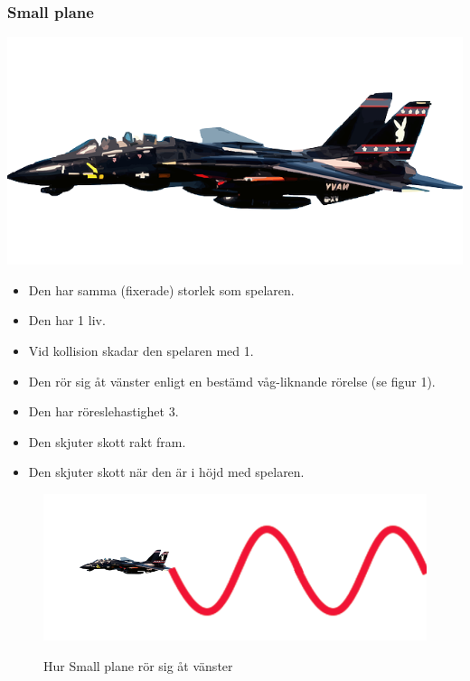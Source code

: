 \documentclass{TDP005mall}
\begin{document}
\subsubsection*{Small plane}
\includegraphics[scale=0.15]{Images/Enemy1.png}
\begin{itemize}
\item Den har samma (fixerade) storlek som spelaren.
\item Den har 1 liv.
\item Vid kollision skadar den spelaren med 1.
\item Den rör sig åt vänster enligt en bestämd våg-liknande rörelse (se figur 1).
\item Den har röreslehastighet 3. 
\item Den skjuter skott rakt fram.
\item Den skjuter skott när den är i höjd med spelaren.
\end{itemize}
\begin{figure}[h!]
  \centering
  \includegraphics[scale=0.4]{Images/Enemy1-movement.png}
  \label{Bild 1}
  \caption{Hur Small plane rör sig åt vänster}
\end{figure}



\newpage
\end{document}
